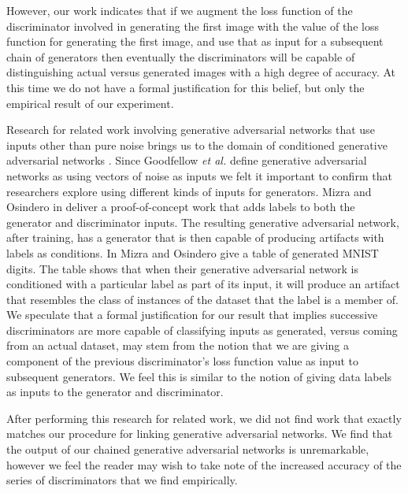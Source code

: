 \documentclass[conference]{IEEEtran}
\begin{document}
However, our work indicates that if we augment the loss function of the
discriminator involved in generating the first image with the value of the loss
function for generating the first image, and use that as input for a subsequent
chain of generators then eventually the discriminators will be capable of
distinguishing actual versus generated images with a high degree of accuracy.
At this time we do not have a formal justification for this belief, but only the
empirical result of our experiment.

Research for related work involving generative adversarial networks that use
inputs other than pure noise brings us to the domain of conditioned generative
adversarial networks \cite{cgan}.  Since Goodfellow \textit{et al.} define
generative adversarial networks as using vectors of noise as inputs we felt it
important to confirm that researchers explore using different kinds of inputs
for generators.  Mizra and Osindero in \cite{cgan} deliver a proof-of-concept
work that adds labels to both the generator and discriminator inputs.  The
resulting generative adversarial network, after training, has a generator that
is then capable of producing artifacts with labels as conditions.  In
\cite{cgan} Mizra and Osindero give a table of generated MNIST \cite{mnist}
digits.  The table shows that when their generative adversarial network is 
conditioned with a particular label as part of its input, it will produce an
artifact that resembles the class of instances of the dataset that the label
is a member of.  We speculate that a formal justification for our result that
implies successive discriminators are more capable of classifying inputs as
generated, versus coming from an actual dataset, may stem from the notion that
we are giving a component of the previous discriminator's loss function value as
input to subsequent generators.  We feel this is similar to the notion of giving
data labels as inputs to the generator and discriminator.

After performing this research for related work, we did not find work that
exactly matches our procedure for linking generative adversarial networks.  We
find that the output of our chained generative adversarial networks is
unremarkable, however we feel the reader may wish to take note of the increased
accuracy of the series of discriminators that we find empirically.
\end{document}
